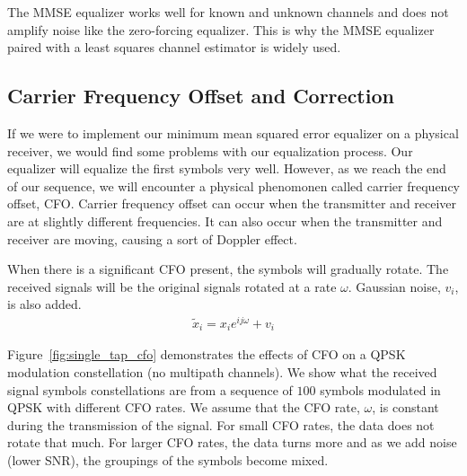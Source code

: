 The MMSE equalizer works well for known and unknown channels and does not amplify noise like the zero-forcing equalizer.  This is why the MMSE equalizer paired with a least squares channel estimator is widely used.

 
\subsection{Carrier Frequency Offset and Correction}

If we were to implement our minimum mean squared error equalizer on a physical receiver, we would find some problems with our equalization process.  
Our equalizer will equalize the first symbols very well.  However, as we reach the end of our sequence, we will encounter a physical phenomonen called carrier frequency offset, CFO.
Carrier frequency offset can occur when the transmitter and receiver are at slightly different frequencies.  It can also occur when the transmitter and receiver are moving, causing a sort of Doppler effect. 

When there is a significant CFO present, the symbols will gradually rotate. The received signals will be the original signals rotated at a rate $\omega$. Gaussian noise, $v_i$, is also added.
\begin{align}
\tilde{x}_i = x_i e^{ij\omega}+v_i
\end{align} 

Figure~\ref{fig:single_tap_cfo} demonstrates the effects of CFO on a QPSK modulation constellation (no multipath channels). 
We show what the received signal symbols constellations are from a sequence of $100$ symbols modulated in QPSK with different CFO rates.  We assume that the CFO rate, $\omega$, is constant during the transmission of the signal.
For small CFO rates, the data does not rotate that much.  For larger CFO rates, the data turns more and as we add noise (lower SNR), the groupings of the symbols become mixed.

